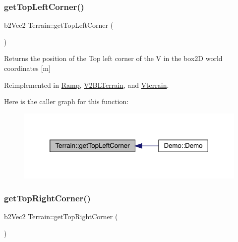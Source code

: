 \subsubsection{\texorpdfstring{get\+Top\+Left\+Corner()}{getTopLeftCorner()}}
{\footnotesize\ttfamily b2\+Vec2 Terrain\+::get\+Top\+Left\+Corner (\begin{DoxyParamCaption}{ }\end{DoxyParamCaption})\hspace{0.3cm}{\ttfamily [virtual]}}

\begin{DoxyReturn}{Returns}
the position of the Top left corner of the V in the box2D world coordinates \mbox{[}m\mbox{]} 
\end{DoxyReturn}


Reimplemented in \mbox{\hyperlink{class_ramp_aefcb53f7b43d3706400e7f16c77a7e18}{Ramp}}, \mbox{\hyperlink{class_v2_b_l_terrain_a57bfd1489ee3074d08513865f2197897}{V2\+B\+L\+Terrain}}, and \mbox{\hyperlink{class_vterrain_a2a6ee2632c67ebe63871e7954bb199b1}{Vterrain}}.

Here is the caller graph for this function\+:\nopagebreak
\begin{figure}[H]
\begin{center}
\leavevmode
\includegraphics[width=320pt]{class_terrain_a8a8629396e5cb03961649acdc23eacf2_icgraph}
\end{center}
\end{figure}
\mbox{\label{class_terrain_a10fcf414cba83e769d99156fe16aa795}} 
\subsubsection{\texorpdfstring{get\+Top\+Right\+Corner()}{getTopRightCorner()}}
{\footnotesize\ttfamily b2\+Vec2 Terrain\+::get\+Top\+Right\+Corner (\begin{DoxyParamCaption}{ }\end{DoxyParamCaption})\hspace{0.3cm}{\ttfamily [virtual]}}

